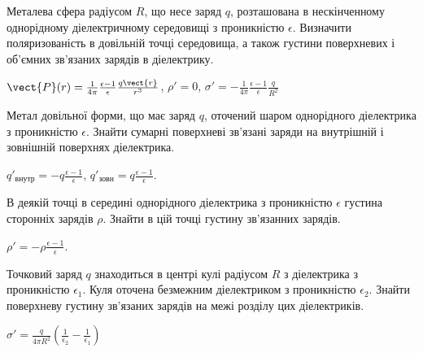 \begin{problem} %
Металева сфера радіусом $R$, що несе заряд $q$, розташована в нескінченному однорідному діелектричному середовищі з проникністю $\epsilon$. Визначити поляризованість в довільній точці середовища, а також густини поверхневих і об'ємних зв'язаних зарядів в діелектрику.
\begin{solution}
	$\vect{P}(r) = \frac{1}{4\pi}\frac{\epsilon -1 }{\epsilon}\frac{q\vect{r}}{r^3}$,
	$\rho'=0$,
	$\sigma'=  - \frac{1}{4\pi}\frac{\epsilon -1 }{\epsilon}\frac{q}{R^2}$
\end{solution}
\end{problem}


\begin{problem}
	Метал довільної форми, що має заряд $q$, оточений шаром однорідного діелектрика з проникністю $\epsilon$. Знайти сумарні поверхневі зв'язані заряди на внутрішній і зовнішній поверхнях діелектрика.
	\begin{solution}
		$q'_\text{внутр} = -q\frac{\epsilon - 1}{\epsilon}$, 	$q'_\text{зовн} = q\frac{\epsilon - 1}{\epsilon}$.
	\end{solution}
\end{problem}


\begin{problem}
	В деякій точці в середині однорідного діелектрика з проникністю $\epsilon$ густина сторонніх зарядів $\rho$. Знайти в цій точці густину зв'язанних зарядів.
	\begin{solution}
		$\rho' = -\rho \frac{\epsilon - 1}{\epsilon}$.
	\end{solution}
\end{problem}


\begin{problem}%
Точковий заряд $q$ знаходиться в центрі кулі радіусом $R$ з діелектрика з проникністю $\epsilon_1$. Куля оточена безмежним діелектриком з проникністю $\epsilon_2$. Знайти поверхневу густину зв'язаних зарядів на межі розділу цих діелектриків.
\begin{solution}
	$\sigma' = \frac{q}{4\pi R^2}\left( \frac{1}{\epsilon_2} - \frac{1}{\epsilon_1} \right) $
\end{solution}
\end{problem}


